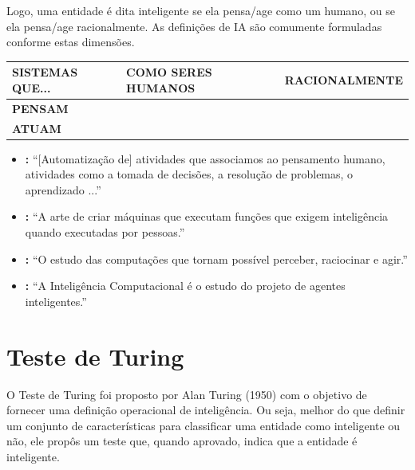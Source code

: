 Logo, uma entidade é dita inteligente se ela pensa/age como um humano, ou se ela pensa/age racionalmente. As definições de IA são comumente formuladas conforme estas dimensões.

\insertspace

\begin{center}
	\begin{tabular}{l|l|l}
		\hline
		\textbf{SISTEMAS QUE...} & \textbf{COMO SERES HUMANOS} & \textbf{RACIONALMENTE} \\
		\hline
		\textbf{PENSAM} & \cite{Bellman1978} & \cite{Winston1992} \\
		\hline
		\textbf{ATUAM} & \cite{KurzweilEtAl1990} & \cite{PooleEtAl1998} \\
		\hline
	\end{tabular}
\end{center}

\insertspace

\begin{itemize}
	\item \textbf{\cite{Bellman1978}:} ``[Automatização de] atividades que associamos ao pensamento humano, atividades como a tomada de decisões, a resolução de problemas, o aprendizado ...''
	
	\item \textbf{\cite{KurzweilEtAl1990}:} ``A arte de criar máquinas que executam funções que exigem inteligência quando executadas por pessoas.''
	
	\item \textbf{\cite{Winston1992}:} ``O estudo das computações que tornam possível perceber, raciocinar e agir.''
	
	\item \textbf{\cite{PooleEtAl1998}:} ``A Inteligência Computacional é o estudo do projeto de agentes inteligentes.''
\end{itemize}

\insertspace

\section{Teste de Turing}

O Teste de Turing foi proposto por Alan Turing (1950) com o objetivo de fornecer uma definição operacional de inteligência. Ou seja, melhor do que definir um conjunto de características para classificar uma entidade como inteligente ou não, ele propôs um teste que, quando aprovado, indica que a entidade é inteligente.

